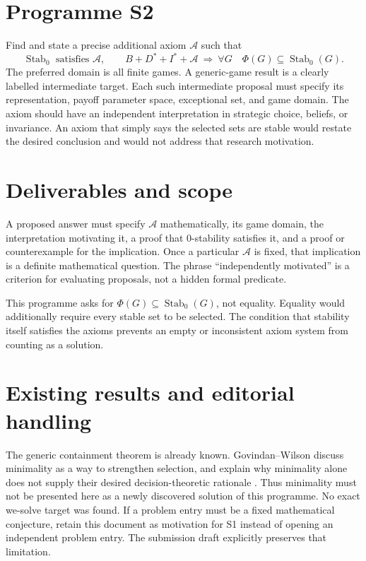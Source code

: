 \documentclass[11pt]{article}
\newcommand{\Stab}{\operatorname{Stab}_0}
\begin{document}
\section*{Programme S2}
Find and state a precise additional axiom $\mathcal A$ such that
\[
 \Stab\text{ satisfies }\mathcal A,
 \qquad
 B+D^*+I^*+\mathcal A
    \ \Longrightarrow\ 
 \forall G\quad\Phi(G)\subseteq\Stab(G).
\]
The preferred domain is all finite games. A generic-game result is a
clearly labelled intermediate target. Each such intermediate proposal
must specify its representation, payoff parameter space, exceptional
set, and game domain. The axiom should have an
independent interpretation in strategic choice, beliefs, or invariance.
An axiom that simply says the selected sets are stable would restate the
desired conclusion and would not address that research motivation.

\section*{Deliverables and scope}
A proposed answer must specify $\mathcal A$ mathematically, its game
domain, the interpretation motivating it, a proof that $0$-stability
satisfies it, and a proof or counterexample for the implication.
Once a particular $\mathcal A$ is fixed, that implication is a definite
mathematical question. The phrase ``independently motivated'' is a
criterion for evaluating proposals, not a hidden formal predicate.

This programme asks for $\Phi(G)\subseteq\Stab(G)$, not equality.
Equality would additionally require every stable set to be selected.
The condition that stability itself satisfies the axioms prevents an
empty or inconsistent axiom system from counting as a solution.

\section*{Existing results and editorial handling}
The generic containment theorem is already known. Govindan--Wilson
discuss minimality as a way to strengthen selection, and explain why
minimality alone does not supply their desired decision-theoretic
rationale \cite[Sections 6.1 and 10]{gw}. Thus minimality must not be
presented here as a newly discovered solution of this programme.
No exact we-solve target was found. If a problem entry must be a fixed
mathematical conjecture, retain this document as motivation for S1
instead of opening an independent problem entry. The submission draft
explicitly preserves that limitation.
\end{document}
